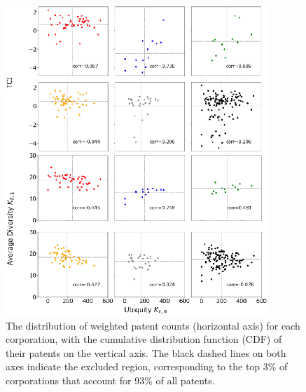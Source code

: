 \documentclass[fleqn,10pt]{wlscirep}
\begin{document}
\begin{figure}[ht]
    \centering
    \includegraphics[scale=0.75]{Figs/FigA1.eps}
    \caption{The distribution of weighted patent counts (horizontal axis) for each corporation, with the cumulative distribution function (CDF) of their patents on the vertical axis. The black dashed lines on both axes indicate the excluded region, corresponding to the top 3\% of corporations that account for 93\% of all patents.}
    \label{fig:patentdistribution}
\end{figure}
\end{document}
